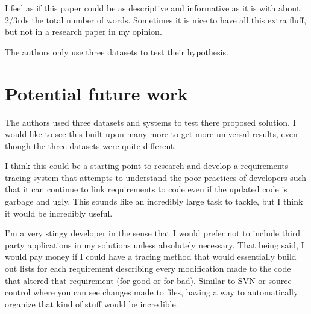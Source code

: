 \documentclass[11pt,twoside]{IEEEtran}
\begin{document}
I feel as if this paper could be as descriptive and informative as it is with about 2/3rds the total number of words. Sometimes it is nice to have all this extra fluff, but not in a research paper in my opinion.

The authors only use three datasets to test their hypothesis.


\section{Potential future work}
The authors used three datasets and systems to test there proposed solution. I would like to see this built upon many more to get more universal results, even though the three datasets were quite different.

I think this could be a starting point to research and develop a requirements tracing system that attempts to understand the poor practices of developers such that it can continue to link requirements to code even if the updated code is garbage and ugly. This sounds like an incredibly large task to tackle, but I think it would be incredibly useful. 

I'm a very stingy developer in the sense that I would prefer not to include third party applications in my solutions unless absolutely necessary. That being said, I would pay money if I could have a tracing method that would essentially build out lists for each requirement describing every modification made to the code that altered that requirement (for good or for bad). Similar to SVN or source control where you can see changes made to files, having a way to automatically organize that kind of stuff would be incredible.
\end{document}
